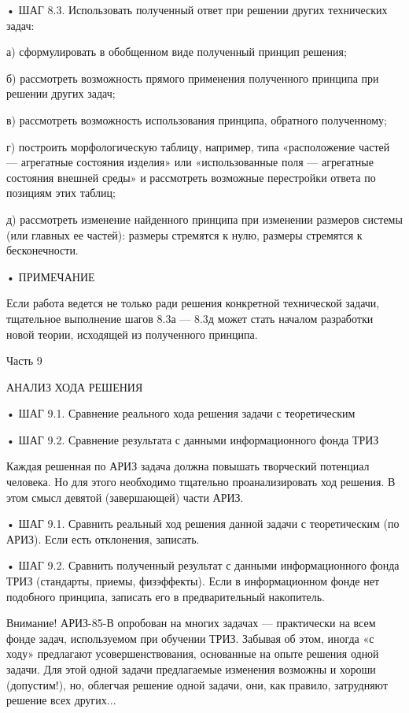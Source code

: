 •  ШАГ   8.3.  Использовать   полученный  ответ  при   решении  других
технических задач:

а) сформулировать в обобщенном виде полученный принцип решения;

б) рассмотреть возможность прямого применения полученного принципа при
решении других задач;

в)   рассмотреть   возможность   использования   принципа,   обратного
полученному;

г)  построить морфологическую  таблицу,  например, типа  «расположение
частей  —  агрегатные  состояния  изделия»  или  «использованные  поля
—  агрегатные   состояния  внешней  среды»  и   рассмотреть  возможные
перестройки ответа по позициям этих таблиц;

д) рассмотреть  изменение найденного  принципа при  изменении размеров
системы (или  главных ее  частей): размеры  стремятся к  нулю, размеры
стремятся к бесконечности.

• ПРИМЕЧАНИЕ

Если  работа ведется  не  только ради  решения конкретной  технической
задачи, тщательное  выполнение шагов 8.3а  — 8.3д может  стать началом
разработки новой теории, исходящей из полученного принципа.


Часть 9

АНАЛИЗ ХОДА РЕШЕНИЯ

• ШАГ 9.1. Сравнение реального хода решения задачи с теоретическим

• ШАГ 9.2. Сравнение результата с данными информационного фонда ТРИЗ

Каждая решенная  по АРИЗ  задача должна повышать  творческий потенциал
человека.  Но  для  этого необходимо  тщательно  проанализировать  ход
решения. В этом смысл девятой (завершающей) части АРИЗ.

• ШАГ 9.1. Сравнить реальный ход решения данной задачи с теоретическим
(по АРИЗ). Если есть отклонения, записать.

•  ШАГ 9.2.  Сравнить полученный  результат с  данными информационного
фонда  ТРИЗ (стандарты,  приемы,  физэффекты).  Если в  информационном
фонде  нет   подобного  принципа,   записать  его   в  предварительный
накопитель.

Внимание! АРИЗ-85-В опробован на многих  задачах — практически на всем
фонде задач, используемом  при обучении ТРИЗ. Забывая  об этом, иногда
«с ходу»  предлагают усовершенствования,  основанные на  опыте решения
одной задачи. Для этой одной  задачи предлагаемые изменения возможны и
хороши  (допустим!),  но,  облегчая  решение одной  задачи,  они,  как
правило, затрудняют решение всех других...


